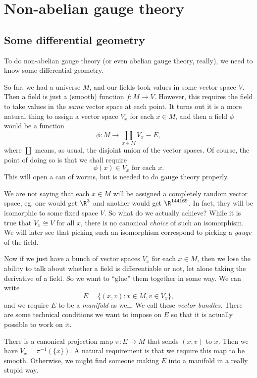 \documentclass[a4paper]{article}
\begin{document}
\section{Non-abelian gauge theory}
\subsection{Some differential geometry}
To do non-abelian gauge theory (or even abelian gauge theory, really), we need to know some differential geometry.

So far, we had a universe $M$, and our fields took values in some vector space $V$. Then a field is just a (smooth) function $f: M \to V$. However, this requires the field to take values in the \emph{same} vector space at each point. It turns out it is a more natural thing to assign a vector space $V_x$ for each $x \in M$, and then a field $\phi$ would be a function
\[
  \phi: M \to \coprod_{x \in M} V_x \equiv E,
\]
where $\coprod$ means, as usual, the disjoint union of the vector spaces. Of course, the point of doing so is that we shall require
\[
  \phi(x) \in V_x \text{ for each $x$}.\tag{$*$}
\]
This will open a can of worms, but is needed to do gauge theory properly.

We are not saying that each $x \in M$ will be assigned a completely random vector space, eg. one would get $\R^3$ and another would get $\R^{144169}$. In fact, they will be isomorphic to some fixed space $V$. So what do we actually achieve? While it is true that $V_x \cong V$ for all $x$, there is no canonical \emph{choice} of such an isomorphism. We will later see that picking such an isomorphism correspond to picking a \emph{gauge} of the field.

Now if we just have a bunch of vector spaces $V_x$ for each $x \in M$, then we lose the ability to talk about whether a field is differentiable or not, let alone taking the derivative of a field. So we want to ``glue'' them together in some way. We can write
\[
  E = \{(x, v): x \in M, v \in V_x\},
\]
and we require $E$ to be a \emph{manifold} as well. We call these \emph{vector bundles}. There are some technical conditions we want to impose on $E$ so that it is actually possible to work on it.

There is a canonical projection map $\pi: E \to M$ that sends $(x, v)$ to $x$. Then we have $V_x = \pi^{-1}(\{x\})$. A natural requirement is that we require this map to be smooth. Otherwise, we might find someone making $E$ into a manifold in a really stupid way.
\end{document}
